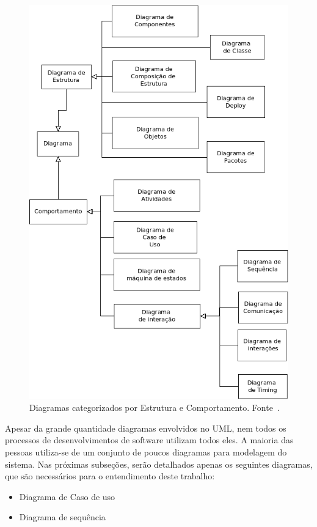 \begin{figure}
	\centering
	\includegraphics[scale=0.75]{images/categorias-diagramas.png}
	\caption{Diagramas categorizados por Estrutura e Comportamento. Fonte~\cite{fowler04}.}
	\label{fig:categorias-diagramas}
\end{figure}

Apesar da grande quantidade diagramas envolvidos no UML, nem todos os processos de desenvolvimentos de software utilizam todos eles. A maioria das pessoas utiliza-se de um conjunto de poucos diagramas para modelagem do sistema. Nas próximas subseções, serão detalhados apenas os seguintes diagramas, que são necessários para o entendimento deste trabalho:

\begin{itemize}
	\item Diagrama de Caso de uso
	\item Diagrama de sequência
\end{itemize}

